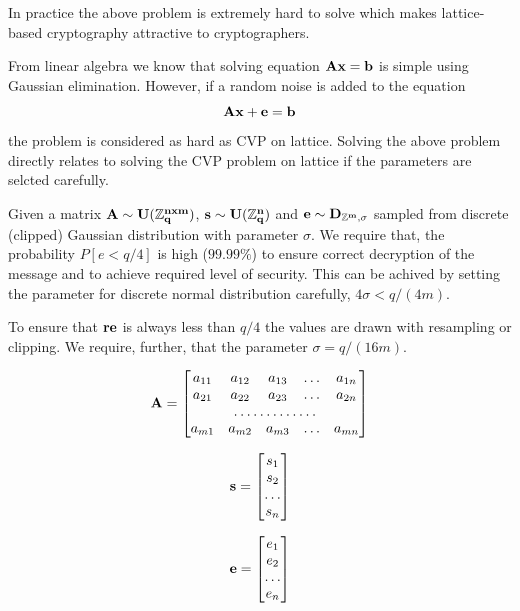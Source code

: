 In practice the above problem is extremely hard to solve which makes lattice-based cryptography 
attractive to cryptographers.

From linear algebra we know that solving equation $\bf{Ax}=\bf{b}$ is simple using
Gaussian elimination. However, if a random noise is added to the equation $$\bf{Ax} + \bf{e} = \bf{b}$$ the 
problem is considered as hard as CVP on lattice. Solving the above problem directly relates to 
solving the CVP problem on lattice if the parameters are selcted carefully.

Given a matrix $\bf{A} \sim U(\mathbb{Z}^{nxm}_q)$, $\bf{s} \sim U(\mathbb{Z}^{n}_q)$ and $\bf{e} \sim D_{\mathbb{Z}^{m}, \sigma}$ 
sampled from discrete (clipped) Gaussian distribution with parameter $\sigma$. We require that, the probability
$P[e < q/4]$ is high (\ie $99.99\%$) to ensure correct decryption of the message and to achieve required 
level of security. This can be achived by setting the parameter for discrete normal distribution carefully, \ie $4\sigma < q/(4m)$.

To ensure that $\bf{re}$ is always less than $q/4$ the values are drawn with resampling
or clipping. We require, further, that the parameter $\sigma = q/(16m)$.

\begin{equation}
    {\bf A}=\begin{bmatrix}
        a_{11}       & a_{12} & a_{13} & \dots & a_{1n} \\
        a_{21}       & a_{22} & a_{23} & \dots & a_{2n} \\
        \hdotsfor{5} \\
        a_{m1}       & a_{m2} & a_{m3} & \dots & a_{mn}
    \end{bmatrix}
\end{equation}

\begin{equation}
    {\bf s}=\begin{bmatrix}
        s_{1} \\
        s_{2} \\
        \dots \\
        s_{n} 
    \end{bmatrix}
\end{equation}

\begin{equation}
    {\bf e}=\begin{bmatrix}
        e_{1} \\
        e_{2} \\
        \dots \\
        e_{n} 
    \end{bmatrix}
\end{equation}

